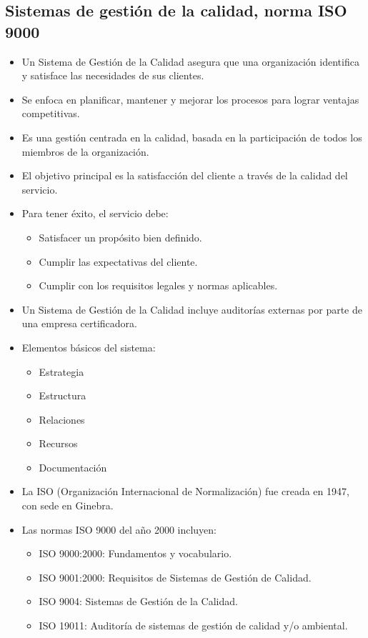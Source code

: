 \documentclass{article} %
\begin{document}
\subsection{Sistemas de gestión de la calidad, norma ISO 9000}
\begin{itemize}
    \item Un Sistema de Gestión de la Calidad asegura que una organización identifica y satisface las necesidades de sus clientes.
    \item Se enfoca en planificar, mantener y mejorar los procesos para lograr ventajas competitivas.
    \item Es una gestión centrada en la calidad, basada en la participación de todos los miembros de la organización.
    \item El objetivo principal es la satisfacción del cliente a través de la calidad del servicio.
    \item Para tener éxito, el servicio debe:
    \begin{itemize}
        \item Satisfacer un propósito bien definido.
        \item Cumplir las expectativas del cliente.
        \item Cumplir con los requisitos legales y normas aplicables.
    \end{itemize}
    \item Un Sistema de Gestión de la Calidad incluye auditorías externas por parte de una empresa certificadora.
    \item Elementos básicos del sistema:
    \begin{itemize}
        \item Estrategia
        \item Estructura
        \item Relaciones
        \item Recursos
        \item Documentación
    \end{itemize}
    \item La ISO (Organización Internacional de Normalización) fue creada en 1947, con sede en Ginebra.
    \item Las normas ISO 9000 del año 2000 incluyen:
    \begin{itemize}
        \item ISO 9000:2000: Fundamentos y vocabulario.
        \item ISO 9001:2000: Requisitos de Sistemas de Gestión de Calidad.
        \item ISO 9004: Sistemas de Gestión de la Calidad.
        \item ISO 19011: Auditoría de sistemas de gestión de calidad y/o ambiental.
    \end{itemize}
\end{itemize}
\end{document}
